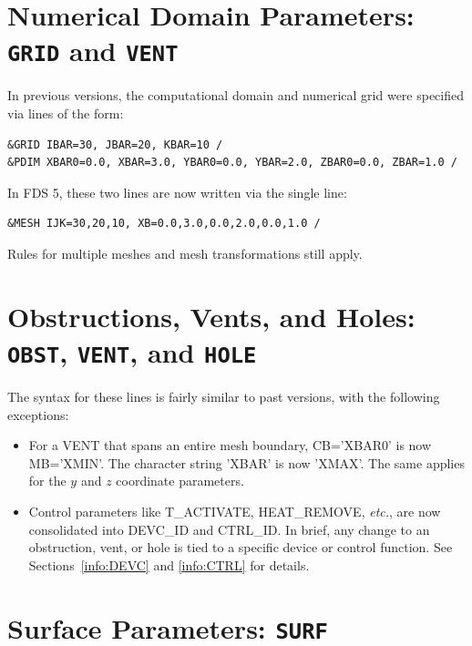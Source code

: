 \documentclass[11pt]{book}
\begin{document}
\section{Numerical Domain Parameters: \texorpdfstring{{\tt GRID}}{GRID} and \texorpdfstring{{\tt VENT}}{VENT} }

In previous versions, the computational domain and numerical grid were specified via lines of the form:

\footnotesize
\begin{verbatim}
&GRID IBAR=30, JBAR=20, KBAR=10 /
&PDIM XBAR0=0.0, XBAR=3.0, YBAR0=0.0, YBAR=2.0, ZBAR0=0.0, ZBAR=1.0 /
\end{verbatim} \normalsize

\noindent
In FDS 5, these two lines are now written via the single line:

\footnotesize
\begin{verbatim}
&MESH IJK=30,20,10, XB=0.0,3.0,0.0,2.0,0.0,1.0 /
\end{verbatim} \normalsize

\noindent
Rules for multiple meshes and mesh transformations still apply.

\section{Obstructions, Vents, and Holes: \texorpdfstring{{\tt OBST}}{OBST}, \texorpdfstring{{\tt VENT}}{VENT}, and \texorpdfstring{{\tt HOLE}}{HOLE}}

The syntax for these lines is fairly similar to past versions, with the following exceptions:
\begin{itemize}
\item For a {\ct VENT} that spans an entire mesh boundary, {\ct CB='XBAR0'} is now {\ct MB='XMIN'}. The character string
{\ct 'XBAR'} is now {\ct 'XMAX'}. The same applies for the $y$ and $z$ coordinate parameters.
\item Control parameters like {\ct T\_ACTIVATE}, {\ct HEAT\_REMOVE}, {\em etc.}, are now consolidated into {\ct DEVC\_ID} and
{\ct CTRL\_ID}. In brief,
any change to an obstruction, vent, or hole is tied to a specific device or control function. See Sections~\ref{info:DEVC} and
\ref{info:CTRL} for details.
\end{itemize}


\section{Surface Parameters: \texorpdfstring{{\tt SURF}}{SURF}}
\end{document}
